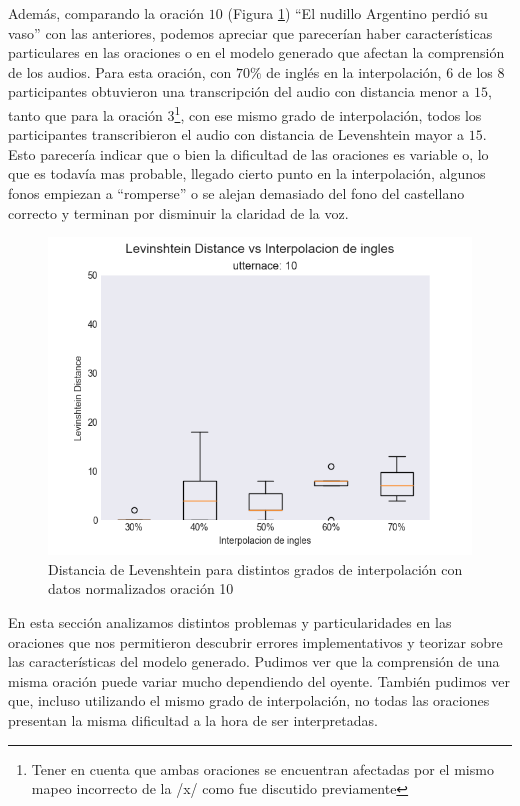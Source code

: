 
Además, comparando la oración $10$ (Figura \ref{boxplot:fig10}) ``El nudillo Argentino perdió su vaso'' con las anteriores, podemos apreciar que parecerían haber características particulares en las oraciones o en el modelo generado que afectan la comprensión de los audios. Para esta oración, con $70\%$ de inglés en la interpolación, $6$ de los $8$ participantes obtuvieron una transcripción del audio con distancia menor a $15$, tanto que para la oración $3$\footnote{Tener en cuenta que ambas oraciones se encuentran afectadas por el mismo mapeo incorrecto de la /x/ como fue discutido previamente}, con ese mismo grado de interpolación, todos los participantes transcribieron el audio con distancia de Levenshtein mayor a $15$. Esto parecería indicar que o bien la dificultad de las oraciones es variable o, lo que es todavía mas probable, llegado cierto punto en la interpolación, algunos fonos empiezan a ``romperse'' o se alejan demasiado del fono del castellano correcto y terminan por disminuir la claridad de la voz.

\begin{figure}
\begin{center}
\includegraphics[trim={0 0 0 1.25cm},clip,width=.5\textwidth]{imagenes/plots_normalized/10.png}
\end{center}
\caption{Distancia de Levenshtein para distintos grados de interpolación con datos normalizados oración 10}
\label{boxplot:fig10}
\end{figure}

En esta sección analizamos distintos problemas y particularidades en las oraciones que nos permitieron descubrir errores implementativos y teorizar sobre las características del modelo generado. Pudimos ver que la comprensión de una misma oración puede variar mucho dependiendo del oyente. También pudimos ver que, incluso utilizando el mismo grado de interpolación, no todas las oraciones presentan la misma dificultad a la hora de ser interpretadas.

